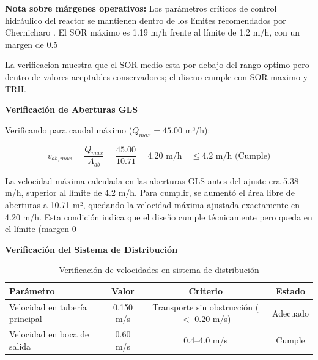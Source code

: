 \documentclass[12pt,a4paper]{article}
\begin{document}
\textbf{Nota sobre márgenes operativos:} Los parámetros críticos de control hidráulico del reactor se mantienen dentro de los límites recomendados por Chernicharo \cite{chernicharo2007}. El SOR máximo es 1.19 m/h frente al límite de 1.2 m/h, con un margen de 0.5%

La verificacion muestra que el SOR medio esta por debajo del rango optimo pero dentro de valores aceptables conservadores; el diseno cumple con SOR maximo y TRH.

\textbf{Verificación de Aberturas GLS}

Verificando para caudal máximo ($Q_{max} = 45.00$ m³/h):

\begin{equation}
v_{ab,max} = \frac{Q_{max}}{A_{ab}} = \frac{45.00}{10.71} = 4.20 \text{ m/h} \quad \leq 4.2 \text{ m/h } \text{(Cumple)}
\end{equation}

La velocidad máxima calculada en las aberturas GLS antes del ajuste era 5.38 m/h, superior al límite de 4.2 m/h. Para cumplir, se aumentó el área libre de aberturas a 10.71 m², quedando la velocidad máxima ajustada exactamente en 4.20 m/h. Esta condición indica que el diseño cumple técnicamente pero queda en el límite (margen 0 %

\textbf{Verificación del Sistema de Distribución}

\begin{table}[H]
\centering
\caption{Verificación de velocidades en sistema de distribución}
\begin{tabular}{lccc}
\toprule
\textbf{Parámetro} & \textbf{Valor} & \textbf{Criterio} & \textbf{Estado} \\
\midrule
Velocidad en tubería principal& 0.150 m/s & Transporte sin obstrucción ($<$ 0.20 m/s) & Adecuado \\
Velocidad en boca de salida & 0.60 m/s & 0.4--4.0 m/s & Cumple \\
\bottomrule
\end{tabular}
\end{table}
\end{document}
